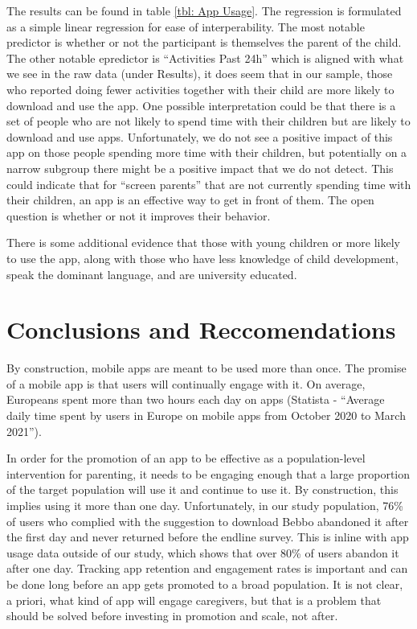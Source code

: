 \documentclass{article}
\begin{document}
The results can be found in table \ref{tbl: App Usage}. The regression is formulated as a simple linear regression for ease of interperability. The most notable predictor is whether or not the participant is themselves the parent of the child. The other notable epredictor is ``Activities Past 24h'' which is aligned with what we see in the raw data (under Results), it does seem that in our sample, those who reported doing fewer activities together with their child are more likely to download and use the app. One possible interpretation could be that there is a set of people who are not likely to spend time with their children but are likely to download and use apps. Unfortunately, we do not see a positive impact of this app on those people spending more time with their children, but potentially on a narrow subgroup there might be a positive impact that we do not detect. This could indicate that for ``screen parents'' that are not currently spending time with their children, an app is an effective way to get in front of them. The open question is whether or not it improves their behavior.

There is some additional evidence that those with young children or more likely to use the app, along with those who have less knowledge of child development, speak the dominant language, and are university educated.





\section{Conclusions and Reccomendations}

By construction, mobile apps are meant to be used more than once. The promise of a mobile app is that users will continually engage with it. On average, Europeans spent more than two hours each day on apps (Statista - ``Average daily time spent by users in Europe on mobile apps from October 2020 to March 2021'').

In order for the promotion of an app to be effective as a population-level intervention for parenting, it needs to be engaging enough that a large proportion of the target population will use it and continue to use it. By construction, this implies using it more than one day. Unfortunately, in our study population, 76\% of users who complied with the suggestion to download Bebbo abandoned it after the first day and never returned before the endline survey. This is inline with app usage data outside of our study, which shows that over 80\% of users abandon it after one day. Tracking app retention and engagement rates is important and can be done long before an app gets promoted to a broad population. It is not clear, a priori, what kind of app will engage caregivers, but that is a problem that should be solved before investing in promotion and scale, not after.
\end{document}
